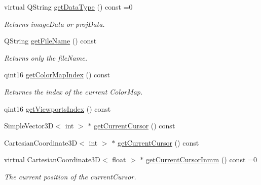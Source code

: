 \begin{DoxyCompactItemize}
\mbox{\label{classScreen__manager_af2ea7252c092d06e846e6d50338db8ca}} 
virtual Q\+String \mbox{\hyperlink{classScreen__manager_af2ea7252c092d06e846e6d50338db8ca}{get\+Data\+Type}} () const =0
\begin{DoxyCompactList}\small\item\em Returns image\+Data or proj\+Data. \end{DoxyCompactList}\item 
\mbox{\label{classScreen__manager_ab773fd2975a54a2baaeb441b2644607d}} 
Q\+String \mbox{\hyperlink{classScreen__manager_ab773fd2975a54a2baaeb441b2644607d}{get\+File\+Name}} () const
\begin{DoxyCompactList}\small\item\em Returns only the file\+Name. \end{DoxyCompactList}\item 
\mbox{\label{classScreen__manager_a44503ee6f24482b8d01797503b0d88a8}} 
qint16 \mbox{\hyperlink{classScreen__manager_a44503ee6f24482b8d01797503b0d88a8}{get\+Color\+Map\+Index}} () const
\begin{DoxyCompactList}\small\item\em Returnes the index of the current Color\+Map. \end{DoxyCompactList}\item 
\mbox{\label{classScreen__manager_aec8c672544208e60368172e662de815e}} 
qint16 \mbox{\hyperlink{classScreen__manager_aec8c672544208e60368172e662de815e}{get\+Viewports\+Index}} () const
\item 
Simple\+Vector3D$<$ int $>$ $\ast$ \mbox{\hyperlink{classScreen__manager_a86a2c051954195c03f8718f4e371c221}{get\+Current\+Cursor}} () const
\item 
Cartesian\+Coordinate3D$<$ int $>$ $\ast$ \mbox{\hyperlink{classScreen__manager_a9cb3da1f84299ee2c32e4032e7e19ed1}{get\+Current\+Cursor}} () const
\item 
\mbox{\label{classScreen__manager_a5437afdf92d233dfba71df3520861d2c}} 
virtual Cartesian\+Coordinate3D$<$ float $>$ $\ast$ \mbox{\hyperlink{classScreen__manager_a5437afdf92d233dfba71df3520861d2c}{get\+Current\+Cursor\+Inmm}} () const =0
\begin{DoxyCompactList}\small\item\em The current position of the current\+Cursor. \end{DoxyCompactList}\item 

\end{DoxyCompactItemize}
